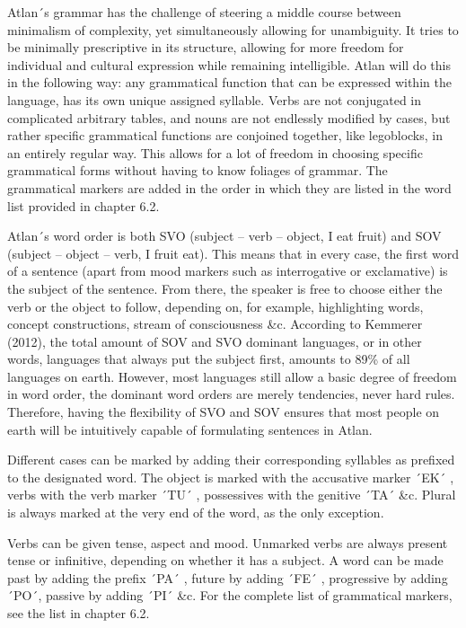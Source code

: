 Atlan´s grammar has the challenge of steering a middle course between minimalism of complexity, yet simultaneously allowing for unambiguity. It tries to be minimally prescriptive in its structure, allowing for more freedom for individual and cultural expression while remaining intelligible. Atlan will do this in the following way: any grammatical function that can be expressed within the language, has its own unique assigned syllable. Verbs are not conjugated in complicated arbitrary tables, and nouns are not endlessly modified by cases, but rather specific grammatical functions are conjoined together, like legoblocks, in an entirely regular way. This allows for a lot of freedom in choosing specific grammatical forms without having to know foliages of grammar. The grammatical markers are added in the order in which they are listed in the word list provided in chapter 6.2.  

Atlan´s word order is both SVO (subject – verb – object, I eat fruit) and SOV (subject – object – verb, I fruit eat). This means that in every case, the first word of a sentence (apart from mood markers such as interrogative or exclamative) is the subject of the sentence. From there, the speaker is free to choose either the verb or the object to follow, depending on, for example, highlighting words, concept constructions, stream of consciousness \&c. According to Kemmerer (2012), the total amount of SOV and SVO dominant languages, or in other words, languages that always put the subject first, amounts to 89\% of all languages on earth. However, most languages still allow a basic degree of freedom in word order, the dominant word orders are merely tendencies, never hard rules. Therefore, having the flexibility of SVO and SOV ensures that most people on earth will be intuitively capable of formulating sentences in Atlan. 

Different cases can be marked by adding their corresponding syllables as prefixed to the designated word. The object is marked with the accusative marker ´EK´ \ek, verbs with the verb marker ´TU´ \tu, possessives with the genitive ´TA´ \ta \&c. Plural is always marked at the very end of the word, as the only exception. 

Verbs can be given tense, aspect and mood. Unmarked verbs are always present tense or infinitive, depending on whether it has a subject. A word can be made past by adding the prefix ´PA´ \pa, future by adding ´FE´ \fe, progressive by adding ´PO´, passive by adding ´PI´ \&c. For the complete list of grammatical markers, see the list in chapter 6.2. 

